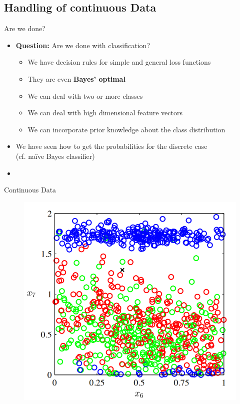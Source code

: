 \subsection{Handling of continuous Data}

\begin{frame}{Are we done?}{}
	\begin{itemize}
		\item \textbf{Question:} Are we done with classification?
		\begin{itemize}
			\item We have decision rules for simple and general loss functions
			\item They are even \textbf{Bayes' optimal}
			\item We can deal with two or more classes
			\item We can deal with high dimensional feature vectors
			\item We can incorporate prior knowledge about the class distribution
		\end{itemize}
		\item We have seen how to get the probabilities for the discrete case \\
			(cf. na\"{i}ve Bayes classifier)
		\item {}
	\end{itemize}
\end{frame}


\begin{frame}{Continuous Data}{}
	\begin{figure}
		\centering
		\includegraphics[scale=0.4]{03_decision_theory/02_img/continuous_data}
	\end{figure}
\end{frame}



